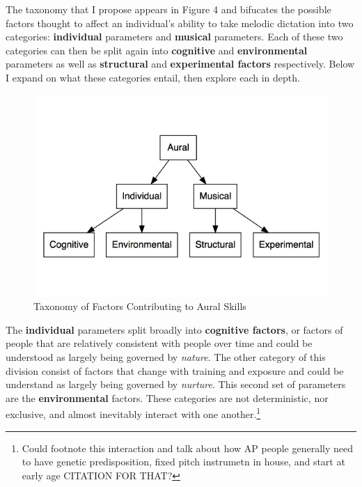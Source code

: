 \documentclass[]{book}
\let\rmarkdownfootnote\footnote%
\def\footnote{\protect\rmarkdownfootnote}
\theoremstyle{definition}
\theoremstyle{definition}
\theoremstyle{definition}
\theoremstyle{remark}
\begin{document}
The taxonomy that I propose appears in Figure 4 and bifucates the
possible factors thought to affect an individual's ability to take
melodic dictation into two categories: \textbf{individual} parameters
and \textbf{musical} parameters. Each of these two categories can then
be split again into \textbf{cognitive} and \textbf{environmental}
parameters as well as \textbf{structural} and \textbf{experimental
factors} respectively. Below I expand on what these categories entail,
then explore each in depth.

\begin{figure}

{\centering \includegraphics[width=18.9in]{img/taxonomy4} 

}

\caption{Taxonomy of Factors Contributing to Aural Skills}\label{fig:unnamed-chunk-2}
\end{figure}

The \textbf{individual} parameters split broadly into \textbf{cognitive
factors}, or factors of people that are relatively consistent with
people over time and could be understood as largely being governed by
\emph{nature}. The other category of this division consist of factors
that change with training and exposure and could be understand as
largely being governed by \emph{nurture}. This second set of parameters
are the \textbf{environmental} factors. These categories are not
deterministic, nor exclusive, and almost inevitably interact with one
another.\footnote{Could footnote this interaction and talk about how AP
  people generally need to have genetic predisposition, fixed pitch
  instrumetn in house, and start at early age CITATION FOR THAT?}
\end{document}
